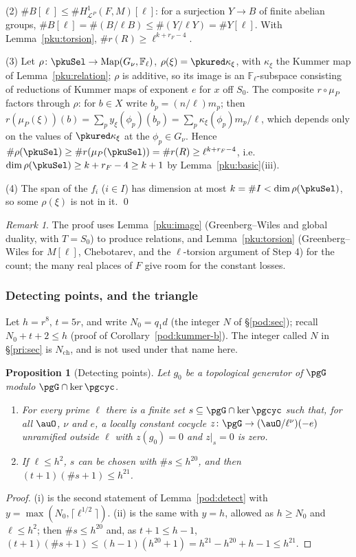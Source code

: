\documentclass[10pt]{amsart}
\newtheorem{proposition}[theorem]{Proposition}
\theoremstyle{definition}
\theoremstyle{remark}
\newtheorem{remark}[theorem]{Remark}
\begin{document}
(2) $\#B[\ell]\le\#H^1_{\mathcal L^P}(F,M)[\ell]$: for a surjection $Y\to B$ of finite abelian groups,
$\#B[\ell]=\#(B/\ell B)\le\#(Y/\ell Y)=\#Y[\ell]$. With Lemma~\ref{pku:torsion},
$\#r(R)\ge\ell^{k+r_F-4}$.

(3) Let $\rho\colon\pkuSel\to\mathrm{Map}(G_\nu,\mathbb F_\ell)$, $\rho(\xi)=\pkured\kappa_\xi$, with
$\kappa_\xi$ the Kummer map of Lemma~\ref{pku:relation}; $\rho$ is additive, so its image is an
$\mathbb F_\ell$-subspace consisting of reductions of Kummer maps of exponent $e$ for $x$ off $S_0$.
The composite $r\circ\mu_P$ factors through $\rho$: for $b\in X$ write $b_p=(n/\ell)m_p$; then
$r(\mu_P(\xi))(b)=\sum_py_\xi(\phi_p)(b_p)=\sum_p\kappa_\xi(\phi_p)m_p/\ell$, which depends only on the
values of $\pkured\kappa_\xi$ at the $\phi_p\in G_\nu$. Hence $\#\rho(\pkuSel)\ge\#r(\mu_P(\pkuSel))=
\#r(R)\ge\ell^{k+r_F-4}$, i.e.\ $\dim\rho(\pkuSel)\ge k+r_F-4\ge k+1$ by Lemma~\ref{pku:basic}(iii).

(4) The span of the $f_i$ ($i\in I$) has dimension at most $k=\#I<\dim\rho(\pkuSel)$, so some
$\rho(\xi)$ is not in it. \qed

\begin{remark}\label{pku:rem-source}
The proof uses Lemma~\ref{pku:image} (Greenberg--Wiles and global duality, with $T=S_0$) to produce
relations, and Lemma~\ref{pku:torsion} (Greenberg--Wiles for $M[\ell]$, Chebotarev, and the
$\ell$-torsion argument of Step 4) for the count; the many real places of $F$ give room for the
constant losses.
\end{remark}

\subsubsection{Detecting points, and the triangle}\label{pku:ss-triangle}

Let $h=r^8$, $t=5r$, and write $N_0=q_1d$ (the integer $N$ of \S\ref{pod:sec}); recall
$N_0+t+2\le h$ (proof of Corollary~\ref{pod:kummer-b}). The integer called $N$ in \S\ref{pri:sec} is
$N_{\mathrm{ch}}$, and is not used under that name here.

\begin{proposition}[Detecting points]\label{pku:b}
Let $g_0$ be a topological generator of $\pgG$ modulo $\pgG\cap\ker\pgcyc$.
\begin{enumerate}
\item[(i)] For every prime $\ell$ there is a finite set $s\subseteq\pgG\cap\ker\pgcyc$ such that, for
all $\auO$, $\nu$ and $e$, a locally constant cocycle $z\colon\pgG\to(\auO/\ell^\nu)(-e)$ unramified
outside $\ell$ with $z(g_0)=0$ and $z|_s=0$ is zero.
\item[(ii)] If $\ell\le h^2$, $s$ can be chosen with $\#s\le h^{20}$, and then $(t+1)(\#s+1)\le h^{21}$.
\end{enumerate}
\end{proposition}
\begin{proof}
(i) is the second statement of Lemma~\ref{pod:detect} with $y=\max(N_0,\lceil\ell^{1/2}\rceil)$. (ii)
is the same with $y=h$, allowed as $h\ge N_0$ and $\ell\le h^2$; then $\#s\le h^{20}$ and, as $t+1\le
h-1$, $(t+1)(\#s+1)\le(h-1)(h^{20}+1)=h^{21}-h^{20}+h-1\le h^{21}$.
\end{proof}
\end{document}
